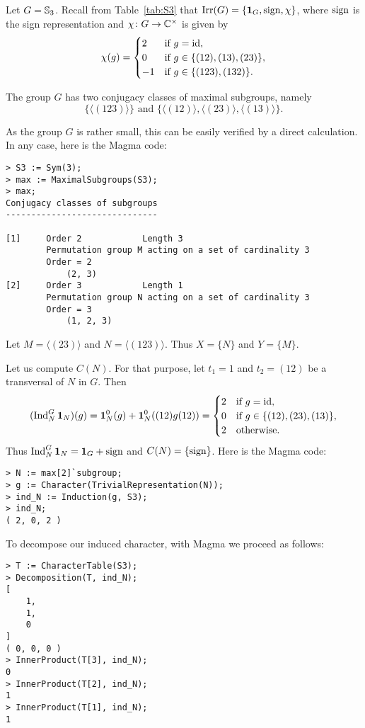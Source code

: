 \begin{example}
    Let $G=\mathbb{S}_3$. 
    Recall from Table~\ref{tab:S3} that $\operatorname{Irr}(G)=\{\mathbf{1}_G,\operatorname{sign},\chi\}$, where $\operatorname{sign}$ is the sign representation
    and $\chi\colon G\to\mathbb{C}^{\times}$ is given by
    \[
    \chi(g)=\begin{cases}
        2 & \text{if $g=\operatorname{id}$},\\
        0 & \text{if $g\in\{(12),(13),(23)\}$},\\
        -1 & \text{if $g\in\{(123),(132)\}.$}
    \end{cases}
    \]

    The group $G$ has two conjugacy classes of maximal subgroups, namely 
    \[
    \{\langle (123)\rangle\}\text{ and }\{\langle(12)\rangle,\langle(23)\rangle,\langle(13)\rangle\}.
    \]

    As the group $G$ is rather small, this can be easily verified 
    by a direct calculation. In any case, here is the Magma code:
    \begin{lstlisting}
> S3 := Sym(3);
> max := MaximalSubgroups(S3);
> max;
Conjugacy classes of subgroups
------------------------------

[1]     Order 2            Length 3
        Permutation group M acting on a set of cardinality 3
        Order = 2
            (2, 3)
[2]     Order 3            Length 1
        Permutation group N acting on a set of cardinality 3
        Order = 3
            (1, 2, 3)
    \end{lstlisting}

    Let $M=\langle (23)\rangle$ and $N=\langle (123)\rangle$. Thus $X=\{N\}$ and 
    $Y=\{M\}$. 
    
    Let us compute $C(N)$. For that purpose, let $t_1=1$ 
    and $t_2=(12)$ be a transversal of $N$ in $G$. Then 
    \[
    (\operatorname{Ind}_{N}^G\mathbf{1}_N)(g)=\mathbf{1}_N^0(g)+\mathbf{1}_N^0((12)g(12))=\begin{cases}
        2 & \text{if $g=\operatorname{id}$},\\
        0 & \text{if $g\in\{(12),(23),(13)\}$},\\
        2 & \text{otherwise.}
    \end{cases}
    \]
    Thus $\operatorname{Ind}_{N}^G\mathbf{1}_N=\mathbf{1}_G+\operatorname{sign}$ and $C(N)=\{\operatorname{sign}\}$. Here is the Magma code: 
\begin{lstlisting}
> N := max[2]`subgroup;
> g := Character(TrivialRepresentation(N));
> ind_N := Induction(g, S3);
> ind_N;
( 2, 0, 2 )
\end{lstlisting}    

To decompose our induced character, with Magma we proceed as follows:
\begin{lstlisting}
> T := CharacterTable(S3);
> Decomposition(T, ind_N);
[
    1,
    1,
    0
]
( 0, 0, 0 )
> InnerProduct(T[3], ind_N);
0
> InnerProduct(T[2], ind_N);
1
> InnerProduct(T[1], ind_N);
1
\end{lstlisting}



\end{example}
